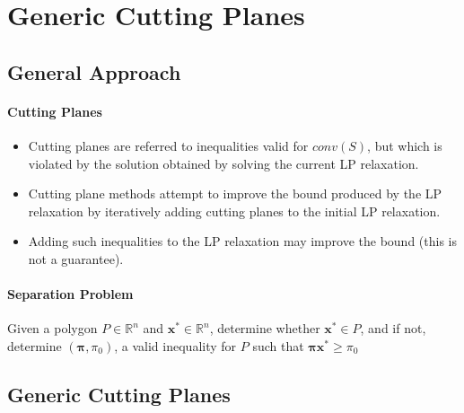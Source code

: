         \section{Generic Cutting Planes}
            \subsection{General Approach}
                \paragraph{Cutting Planes}
                \begin{itemize}
                    \item Cutting planes are referred to inequalities valid for $conv(S)$, but which is violated by the solution obtained by solving the current LP relaxation.
                    \item Cutting plane methods attempt to improve the bound produced by the LP relaxation by iteratively adding cutting planes to the initial LP relaxation.
                    \item Adding such inequalities to the LP relaxation may improve the bound (this is not a guarantee).
                \end{itemize}

                \paragraph{Separation Problem} Given a polygon $P \in \mathbb{R}^n$ and $\mathbf{x}^* \in \mathbb{R}^n$, determine whether $\mathbf{x}^* \in P$, and if not, determine $(\mathbf{\pi}, \pi_0)$, a valid inequality for $P$ such that $\mathbf{\pi} \mathbf{x}^* \ge \pi_0$

            \subsection{Generic Cutting Planes}

